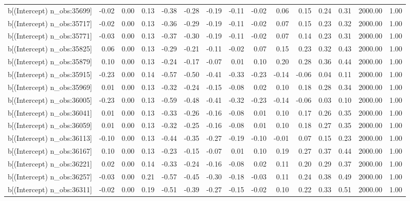 \begin{table}[ht]
\begin{tabular}{rrrrrrrrrrrrrrr}
  b[(Intercept) n\_obs:35699] & -0.02 & 0.00 & 0.13 & -0.38 & -0.28 & -0.19 & -0.11 & -0.02 & 0.06 & 0.15 & 0.24 & 0.31 & 2000.00 & 1.00 \\ 
  b[(Intercept) n\_obs:35717] & -0.02 & 0.00 & 0.13 & -0.36 & -0.29 & -0.19 & -0.11 & -0.02 & 0.07 & 0.15 & 0.23 & 0.32 & 2000.00 & 1.00 \\ 
  b[(Intercept) n\_obs:35771] & -0.03 & 0.00 & 0.13 & -0.37 & -0.30 & -0.19 & -0.11 & -0.02 & 0.07 & 0.14 & 0.23 & 0.31 & 2000.00 & 1.00 \\ 
  b[(Intercept) n\_obs:35825] & 0.06 & 0.00 & 0.13 & -0.29 & -0.21 & -0.11 & -0.02 & 0.07 & 0.15 & 0.23 & 0.32 & 0.43 & 2000.00 & 1.00 \\ 
  b[(Intercept) n\_obs:35879] & 0.10 & 0.00 & 0.13 & -0.24 & -0.17 & -0.07 & 0.01 & 0.10 & 0.20 & 0.28 & 0.36 & 0.44 & 2000.00 & 1.00 \\ 
  b[(Intercept) n\_obs:35915] & -0.23 & 0.00 & 0.14 & -0.57 & -0.50 & -0.41 & -0.33 & -0.23 & -0.14 & -0.06 & 0.04 & 0.11 & 2000.00 & 1.00 \\ 
  b[(Intercept) n\_obs:35969] & 0.01 & 0.00 & 0.13 & -0.32 & -0.24 & -0.15 & -0.08 & 0.02 & 0.10 & 0.18 & 0.28 & 0.34 & 2000.00 & 1.00 \\ 
  b[(Intercept) n\_obs:36005] & -0.23 & 0.00 & 0.13 & -0.59 & -0.48 & -0.41 & -0.32 & -0.23 & -0.14 & -0.06 & 0.03 & 0.10 & 2000.00 & 1.00 \\ 
  b[(Intercept) n\_obs:36041] & 0.01 & 0.00 & 0.13 & -0.33 & -0.26 & -0.16 & -0.08 & 0.01 & 0.10 & 0.17 & 0.26 & 0.35 & 2000.00 & 1.00 \\ 
  b[(Intercept) n\_obs:36059] & 0.01 & 0.00 & 0.13 & -0.32 & -0.25 & -0.16 & -0.08 & 0.01 & 0.10 & 0.18 & 0.27 & 0.35 & 2000.00 & 1.00 \\ 
  b[(Intercept) n\_obs:36113] & -0.10 & 0.00 & 0.13 & -0.44 & -0.35 & -0.27 & -0.19 & -0.10 & -0.01 & 0.07 & 0.15 & 0.23 & 2000.00 & 1.00 \\ 
  b[(Intercept) n\_obs:36167] & 0.10 & 0.00 & 0.13 & -0.23 & -0.15 & -0.07 & 0.01 & 0.10 & 0.19 & 0.27 & 0.37 & 0.44 & 2000.00 & 1.00 \\ 
  b[(Intercept) n\_obs:36221] & 0.02 & 0.00 & 0.14 & -0.33 & -0.24 & -0.16 & -0.08 & 0.02 & 0.11 & 0.20 & 0.29 & 0.37 & 2000.00 & 1.00 \\ 
  b[(Intercept) n\_obs:36257] & -0.03 & 0.00 & 0.21 & -0.57 & -0.45 & -0.30 & -0.18 & -0.03 & 0.11 & 0.24 & 0.38 & 0.49 & 2000.00 & 1.00 \\ 
  b[(Intercept) n\_obs:36311] & -0.02 & 0.00 & 0.19 & -0.51 & -0.39 & -0.27 & -0.15 & -0.02 & 0.10 & 0.22 & 0.33 & 0.51 & 2000.00 & 1.00 \\ 

\end{tabular}
\end{table}

